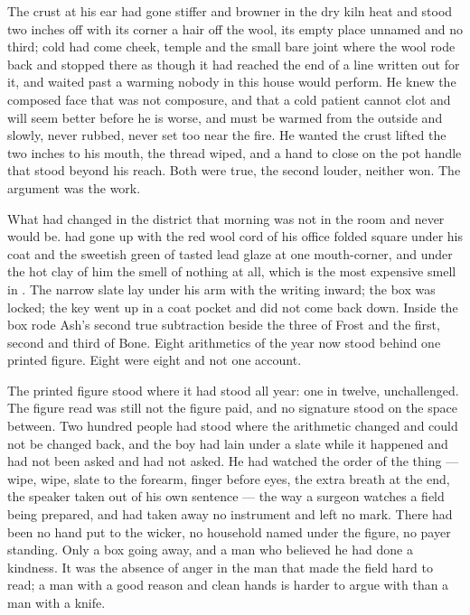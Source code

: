 The crust at his ear had gone stiffer and browner in the dry kiln heat and stood two inches off with its corner a hair off the wool, its empty place unnamed and no third; cold had come cheek, temple and the small bare joint where the wool rode back and stopped there as though it had reached the end of a line written out for it, and  waited past a warming nobody in this house would perform. He knew the composed face that was not composure, and that a cold patient cannot clot and will seem better before he is worse, and must be warmed from the outside and slowly, never rubbed, never set too near the fire. He wanted the crust lifted the two inches to his mouth, the thread wiped, and a hand to close on the pot handle that stood beyond his reach. Both were true, the second louder, neither won. The argument was the work.

\scenebreak

What had changed in the district that morning was not in the room and never would be.  had gone up  with the red wool cord of his office folded square under his coat and the sweetish green of tasted lead glaze at one mouth-corner, and under the hot clay of him the smell of nothing at all, which is the most expensive smell in . The narrow slate lay under his arm with the writing inward; the box was locked; the key went up in a coat pocket and did not come back down. Inside the box rode Ash's second true subtraction beside the three of Frost and the first, second and third of Bone. Eight arithmetics of the year now stood behind one printed figure. Eight were eight and not one account.

The printed figure stood where it had stood all year: one in twelve, unchallenged. The figure read was still not the figure paid, and no signature stood on the space between. Two hundred people had stood where the arithmetic changed and could not be changed back, and the boy had lain under a slate while it happened and had not been asked and had not asked. He had watched the order of the thing --- wipe, wipe, slate to the forearm, finger before eyes, the extra breath at the end, the speaker taken out of his own sentence --- the way a surgeon watches a field being prepared, and had taken away no instrument and left no mark. There had been no hand put to the wicker, no household named under the figure, no payer standing. Only a box going away, and a man who believed he had done a kindness. It was the absence of anger in the man that made the field hard to read; a man with a good reason and clean hands is harder to argue with than a man with a knife.

